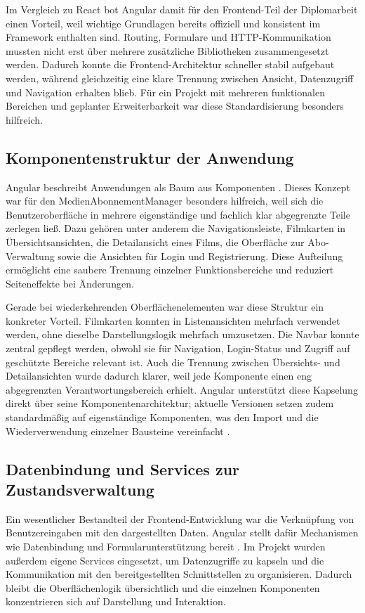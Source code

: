 Im Vergleich zu React bot Angular damit f\"ur den Frontend-Teil der Diplomarbeit einen Vorteil, weil wichtige Grundlagen bereits offiziell und konsistent im Framework enthalten sind. Routing, Formulare und HTTP-Kommunikation mussten nicht erst \"uber mehrere zus\"atzliche Bibliotheken zusammengesetzt werden. Dadurch konnte die Frontend-Architektur schneller stabil aufgebaut werden, w\"ahrend gleichzeitig eine klare Trennung zwischen Ansicht, Datenzugriff und Navigation erhalten blieb. F\"ur ein Projekt mit mehreren funktionalen Bereichen und geplanter Erweiterbarkeit war diese Standardisierung besonders hilfreich.

\subsection{Komponentenstruktur der Anwendung}
Angular beschreibt Anwendungen als Baum aus Komponenten \cite{angular_components}. Dieses Konzept war f\"ur den MedienAbonnementManager besonders hilfreich, weil sich die Benutzeroberfl\"ache in mehrere eigenst\"andige und fachlich klar abgegrenzte Teile zerlegen lie\ss{}. Dazu geh\"oren unter anderem die Navigationsleiste, Filmkarten in \"Ubersichtsansichten, die Detailansicht eines Films, die Oberfl\"ache zur Abo-Verwaltung sowie die Ansichten f\"ur Login und Registrierung. Diese Aufteilung erm\"oglicht eine saubere Trennung einzelner Funktionsbereiche und reduziert Seiteneffekte bei \"Anderungen.

Gerade bei wiederkehrenden Oberfl\"achenelementen war diese Struktur ein konkreter Vorteil. Filmkarten konnten in Listenansichten mehrfach verwendet werden, ohne dieselbe Darstellungslogik mehrfach umzusetzen. Die Navbar konnte zentral gepflegt werden, obwohl sie f\"ur Navigation, Login-Status und Zugriff auf gesch\"utzte Bereiche relevant ist. Auch die Trennung zwischen \"Ubersichts- und Detailansichten wurde dadurch klarer, weil jede Komponente einen eng abgegrenzten Verantwortungsbereich erhielt. Angular unterst\"utzt diese Kapselung direkt \"uber seine Komponentenarchitektur; aktuelle Versionen setzen zudem standardm\"a\ss{}ig auf eigenst\"andige Komponenten, was den Import und die Wiederverwendung einzelner Bausteine vereinfacht \cite{angular_components}.

\subsection{Datenbindung und Services zur Zustandsverwaltung}
Ein wesentlicher Bestandteil der Frontend-Entwicklung war die Verkn\"upfung von Benutzereingaben mit den dargestellten Daten. Angular stellt daf\"ur Mechanismen wie Datenbindung und Formularunterst\"utzung bereit \cite{angular_forms}. Im Projekt wurden au\ss{}erdem eigene Services eingesetzt, um Datenzugriffe zu kapseln und die Kommunikation mit den bereitgestellten Schnittstellen zu organisieren. Dadurch bleibt die Oberfl\"achenlogik \"ubersichtlich und die einzelnen Komponenten konzentrieren sich auf Darstellung und Interaktion.

